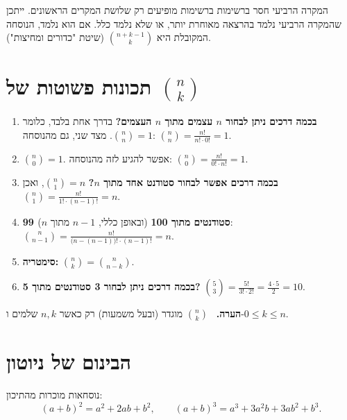 \documentclass[11pt,a4paper]{report}
\newenvironment{remark}{\par\smallskip\noindent\textsf{\textbf{הערה.}}\ }{\par\smallskip}
\newcommand{\flag}{\tikz[baseline=-0.1ex,x=0.9ex,y=0.9ex]{\draw[line width=0.5pt] (0,-0.3)--(0,1.6); \fill (0,1.6)--(1.2,1.2)--(0,0.8)--cycle;}}
\newcounter{todo}
\newcommand{\addtodo}[1]{\refstepcounter{todo}%
  \addcontentsline{tdo}{todo}{\protect\numberline{\thetodo}#1}}
\newcommand{\needcheck}[1]{\addtodo{#1}%
  {\color{todoc}\sffamily\small\,[\textbf{\flag{}\,\thetodo\ לבדיקה:} #1]\,}}
\renewcommand{\needcheck}[1]{}
\begin{document}
\begin{attention}{המקרה הרביעי חסר ברשימות}
ברשימות מופיעים רק שלושת המקרים הראשונים. ייתכן שהמקרה הרביעי נלמד בהרצאה מאוחרת יותר, או שלא נלמד כלל. אם הוא נלמד, הנוסחה המקובלת היא $\binom{n+k-1}{k}$ (שיטת "כדורים ומחיצות").
\end{attention}

\section{תכונות פשוטות של \texorpdfstring{$\binom{n}{k}$}{(n choose k)}}

\begin{enumerate}[label=\textbf{\arabic*.}]
  \item \textbf{בכמה דרכים ניתן לבחור $n$ עצמים מתוך $n$ העצמים?} בדרך אחת בלבד, כלומר $\binom{n}{n}=1$. מצד שני, גם מהנוסחה:
  $\binom{n}{n}=\frac{n!}{n!\cdot0!}=1$.

  \item $\binom{n}{0}=1$. אפשר להגיע לזה מהנוסחה: $\binom{n}{0}=\frac{n!}{0!\cdot n!}=1$.

  \item \textbf{בכמה דרכים אפשר לבחור סטודנט אחד מתוך $n$?} $\binom{n}{1}=n$, ואכן
  $\binom{n}{1}=\frac{n!}{1!\cdot(n-1)!}=n$.\newline
  \needcheck{ברשימות נכתב בסוף החישוב $=n!$; תיקנתי ל-$=n$}

  \item \textbf{99 סטודנטים מתוך 100} (ובאופן כללי, $n-1$ מתוך $n$):
  $\binom{n}{n-1}=\frac{n!}{\big(n-(n-1)\big)!\cdot(n-1)!}=n$.

  \item \textbf{סימטריה:} $\displaystyle\binom{n}{k}=\binom{n}{n-k}$.

  \item \textbf{בכמה דרכים ניתן לבחור 3 סטודנטים מתוך 5?}
  $\binom{5}{3}=\frac{5!}{3!\cdot2!}=\frac{4\cdot5}{2}=10$.
\end{enumerate}

\begin{remark}
$\binom{n}{k}$ מוגדר (ובעל משמעות) רק כאשר $n,k$ שלמים ו-$0\le k\le n$.
\end{remark}

\section{הבינום של ניוטון}

נוסחאות מוכרות מהתיכון:
\[
  (a+b)^2=a^2+2ab+b^2,\qquad (a+b)^3=a^3+3a^2b+3ab^2+b^3.
\]
\end{document}
